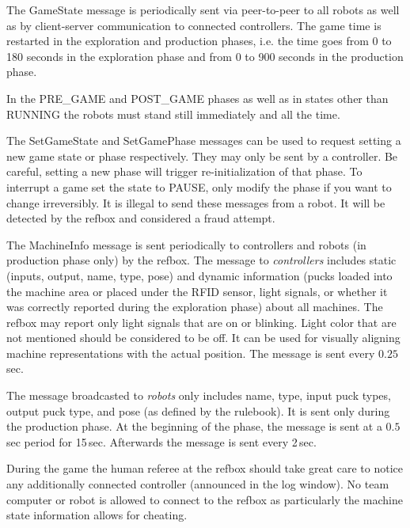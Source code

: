 \documentclass[a4paper]{article}
\begin{document}
%
{%
  The GameState message is periodically sent via peer-to-peer to all
  robots as well as by client-server communication to connected
  controllers. The game time is restarted in the exploration and
  production phases, i.e. the time goes from 0 to 180 seconds in the
  exploration phase and from 0 to 900 seconds in the production phase.

  \medskip

  In the PRE\_GAME and POST\_GAME phases as well as in states other
  than RUNNING the robots must stand still immediately and all the
  time.

  \medskip

  The SetGameState and SetGamePhase messages can be used to request
  setting a new game state or phase respectively. They may only be
  sent by a controller. Be careful, setting a new phase will trigger
  re-initialization of that phase. To interrupt a game set the state
  to PAUSE, only modify the phase if you want to change
  irreversibly. It is illegal to send these messages from a robot. It
  will be detected by the refbox and considered a fraud attempt.
}

%
{%
  The MachineInfo message is sent periodically to controllers and
  robots (in production phase only) by the refbox. The message to
  \emph{controllers} includes static (inputs, output, name, type,
  pose) and dynamic information (pucks loaded into the machine area or
  placed under the RFID sensor, light signals, or whether it was
  correctly reported during the exploration phase) about all machines.
  The refbox may report only light signals that are on or
  blinking. Light color that are not mentioned should be considered to
  be off. It can be used for visually aligning machine representations
  with the actual position. The message is sent every $0.25$\,sec.

  The message broadcasted to \emph{robots} only includes name, type,
  input puck types, output puck type, and pose (as defined by the
  rulebook). It is sent only during the production phase. At the
  beginning of the phase, the message is sent at a $0.5$\,sec period
  for 15\,sec. Afterwards the message is sent every 2\,sec.
 

  \medskip

  During the game the human referee at the refbox should take great
  care to notice any additionally connected controller (announced in
  the log window). No team computer or robot is allowed to connect to
  the refbox as particularly the machine state information allows for
  cheating.
}
\end{document}
